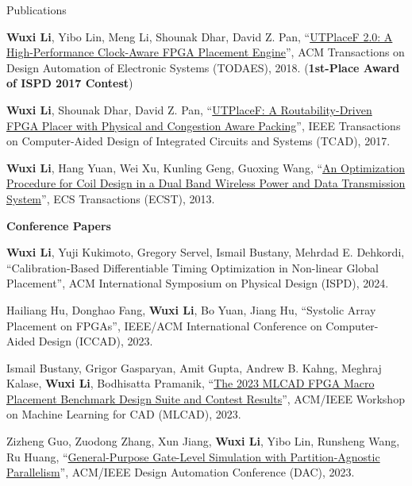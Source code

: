 \begin{rSection}{Publications}
\begin{description}[font=\normalfont]
\item[{[J3]}]{
    \textbf{Wuxi Li}, Yibo Lin, Meng Li, Shounak Dhar, David Z. Pan,
    ``\href{https://dl.acm.org/citation.cfm?id=3174849}{UTPlaceF 2.0: A High-Performance Clock-Aware FPGA Placement Engine}'',
    ACM Transactions on Design Automation of Electronic Systems (TODAES), 2018.
    (\textbf{1st-Place Award of ISPD 2017 Contest})
}

\item[{[J2]}]{
    \textbf{Wuxi Li}, Shounak Dhar, David Z. Pan,
    ``\href{http://ieeexplore.ieee.org/document/7984833/}{UTPlaceF: A Routability-Driven FPGA Placer with Physical and Congestion Aware Packing}'',
    IEEE Transactions on Computer-Aided Design of Integrated Circuits and Systems (TCAD), 2017.
}

\item[{[J1]}]{
    \textbf{Wuxi Li}, Hang Yuan, Wei Xu, Kunling Geng, Guoxing Wang,
    ``\href{http://ecst.ecsdl.org/content/52/1/1091.short}{An Optimization Procedure for Coil Design in a Dual Band Wireless Power and Data Transmission System}'',
    ECS Transactions (ECST), 2013.
}

\end{description}

\textbf{Conference Papers}
\begin{description}[font=\normalfont]
\item[{[C16]}]{
    \textbf{Wuxi Li}, Yuji Kukimoto, Gregory Servel, Ismail Bustany, Mehrdad E. Dehkordi,
    ``Calibration-Based Differentiable Timing Optimization in Non-linear Global Placement'',
    ACM International Symposium on Physical Design (ISPD), 2024.
}

\item[{[C15]}]{
    Hailiang Hu, Donghao Fang, \textbf{Wuxi Li}, Bo Yuan, Jiang Hu,
    ``Systolic Array Placement on FPGAs'',
    IEEE/ACM International Conference on Computer-Aided Design (ICCAD), 2023.
}

\item[{[C14]}]{
    Ismail Bustany, Grigor Gasparyan, Amit Gupta, Andrew B. Kahng, Meghraj Kalase, \textbf{Wuxi Li}, Bodhisatta Pramanik,
    ``\href{https://ieeexplore.ieee.org/abstract/document/10299868}{The 2023 MLCAD FPGA Macro Placement Benchmark Design Suite and Contest Results}'',
    ACM/IEEE Workshop on Machine Learning for CAD (MLCAD), 2023.
}

\item[{[C13]}]{
    Zizheng Guo, Zuodong Zhang, Xun Jiang, \textbf{Wuxi Li}, Yibo Lin, Runsheng Wang, Ru Huang,
    ``\href{https://ieeexplore.ieee.org/document/10247907}{General-Purpose Gate-Level Simulation with Partition-Agnostic Parallelism}'',
    ACM/IEEE Design Automation Conference (DAC), 2023.
}


\end{description}
\end{rSection}
